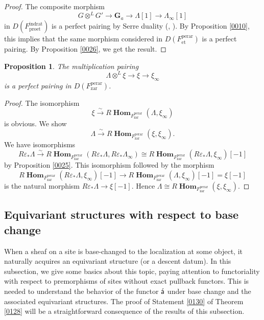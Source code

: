 \documentclass{amsart}
\newtheorem{Prop}[Thm]{Proposition}
\theoremstyle{remark}
\numberwithin{equation}{subsection}
\newcommand{\isomto}{\overset{\sim}{\to}}
\newcommand{\tensor}{\mathbin{\otimes}}
\newcommand{\et}{\mathrm{et}}
\newcommand{\zar}{\mathrm{zar}}
\newcommand{\Ga}{\mathbf{G}_{a}}
\newcommand{\rat}{\mathrm{rat}}
\newcommand{\ind}{\mathrm{ind}}
\newcommand{\pro}{\mathrm{pro}}
\newcommand{\perar}{\mathrm{perar}}
\newcommand{\alg}[1]{\mathbf{#1}}
\newcommand{\algebrize}{\Acute{\mathsf{a}}}
\DeclareMathOperator{\sheafhom}{\alg{Hom}}
\begin{document}
\begin{proof}
	The composite morphism
		\[
			G \otimes^{L} G' \to \Ga \to \Lambda[1] \to \Lambda_{\infty}[1]
		\]
	in $D(F^{\ind\rat}_{\pro\et})$ is a perfect pairing by Serre duality
	(\cite[Proposition 2.4.1]{Suz20}, \cite[Chapter III, Lemma 0.13 (c)]{Mil06}).
	By Proposition \ref{0010},
	this implies that the same morphism considered in $D(F^{\perar}_{\et})$
	is a perfect pairing.
	By Proposition \ref{0026}, we get the result.
\end{proof}

\begin{Prop} \label{0028}
	The multiplication pairing
		\[
				\Lambda \tensor^{L} \xi
			\to
				\xi
			\to
				\xi_{\infty}
		\]
	is a perfect pairing in $D(F^{\perar}_{\zar})$.
\end{Prop}

\begin{proof}
	The isomorphism
		\[
				\xi
			\isomto
				R \sheafhom_{F^{\perar}_{\zar}}(\Lambda, \xi_{\infty})
		\]
	is obvious.
	We show
		\[
				\Lambda
			\isomto
				R \sheafhom_{F^{\perar}_{\zar}}(\xi, \xi_{\infty}).
		\]
	We have isomorphisms
		\[
				R \varepsilon_{\ast} \Lambda
			\isomto
				R \sheafhom_{F^{\perar}_{\zar}}(
					R \varepsilon_{\ast} \Lambda,
					R \varepsilon_{\ast} \Lambda_{\infty}
				)
			\cong
				R \sheafhom_{F^{\perar}_{\zar}}(
					R \varepsilon_{\ast} \Lambda,
					\xi_{\infty}
				)[-1]
		\]
	by Proposition \ref{0025}.
	This isomorphism followed by the morphism
		\[
				R \sheafhom_{F^{\perar}_{\zar}}(R \varepsilon_{\ast} \Lambda, \xi_{\infty})[-1]
			\to
				R \sheafhom_{F^{\perar}_{\zar}}(\Lambda, \xi_{\infty})[-1]
			=
				\xi[-1]
		\]
	is the natural  morphism $R \varepsilon_{\ast} \Lambda \to \xi[-1]$.
	Hence $\Lambda \cong R \sheafhom_{F^{\perar}_{\zar}}(\xi, \xi_{\infty})$.
\end{proof}


\subsection{Equivariant structures with respect to base change}
\label{0518}

When a sheaf on a site is base-changed to the localization at some object,
it naturally acquires an equivariant structure (or a descent datum).
In this subsection, we give some basics about this topic,
paying attention to functoriality with respect to
premorphisms of sites without exact pullback functors.
This is needed to understand the behavior of the functor $\algebrize$ under base change
and the associated equivariant structures.
The proof of Statement \eqref{0130} of Theorem \ref{0128}
will be a straightforward consequence of the results of this subsection.
\end{document}
